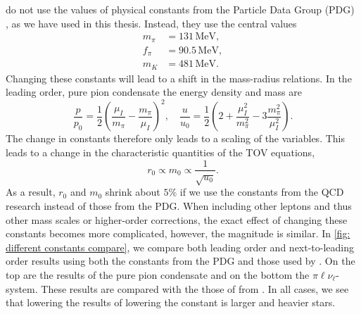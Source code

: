 \citeauthor{brandtNewClassCompact2018} do not use the values of physical constants from the Particle Data Group (PDG) \autocite{particledatagroupReviewParticlePhysics2020}, as we have used in this thesis.
Instead, they use the central values~\autocite{adhikariQuarkPionAxial2021}
%
\begin{align}
    m_\pi &= 131\,\text{MeV},\\
    f_\pi &= 90.5\,\text{MeV},\\
    m_K &= 481\,\text{MeV}.
\end{align}
%
Changing these constants will lead to a shift in the mass-radius relations.
In the leading order, pure pion condensate the energy density and mass are
%
\begin{equation}
    \frac{p}{p_0} = \frac{1}{2} \left(\frac{\mu_I}{m_\pi} - \frac{m_\pi}{\mu_I}\right)^2,
    \quad
    \frac{u}{u_0}
    = \frac{1}{2} \left(2 + \frac{\mu_I^2}{m_\pi^2} - 3\frac{m_\pi^2}{\mu_I^2}\right).
\end{equation}
%
The change in constants therefore only leads to a scaling of the variables.
This leads to a change in the characteristic quantities of the TOV equations,
%
\begin{equation}
    r_0 \propto m_0 \propto \frac{1}{\sqrt{u_0}}.
\end{equation}
%
As a result, $r_0$ and $m_0$ shrink about $5\%$ if we use the constants from the QCD research instead of those from the PDG.
When including other leptons and thus other mass scales or higher-order corrections, the exact effect of changing these constants becomes more complicated, however, the magnitude is similar.
In \autoref{fig: different constants compare}, we compare both leading order and next-to-leading order results using both the constants from the PDG and those used by \citeauthor{brandtNewClassCompact2018}.
On the top are the results of the pure pion condensate and on the bottom the $\pi\ell\nu_\ell$-system.
These results are compared with the those of \citeauthor{brandtNewClassCompact2018} from \autocite{brandtNewClassCompact2018}.
In all cases, we see that lowering the results of lowering the constant is larger and heavier stars.



